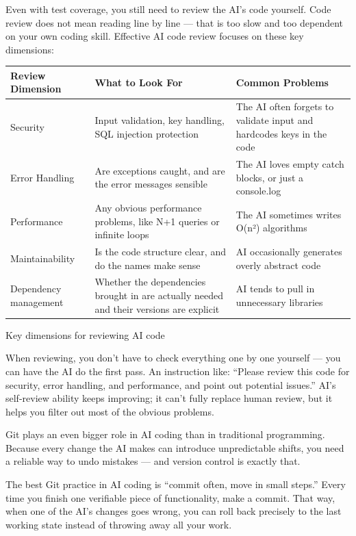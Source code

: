 
Even with test coverage, you still need to review the AI's code yourself. Code review does not mean reading line by line — that is too slow and too dependent on your own coding skill. Effective AI code review focuses on these key dimensions:

\begin{center}
\begin{tabularx}{\linewidth}{|X|X|X|}
\hline
\textbf{Review Dimension} & \textbf{What to Look For} & \textbf{Common Problems} \tabularnewline
\hline
Security & Input validation, key handling, SQL injection protection & The AI often forgets to validate input and hardcodes keys in the code \tabularnewline
Error Handling & Are exceptions caught, and are the error messages sensible & The AI loves empty catch blocks, or just a console.log \tabularnewline
Performance & Any obvious performance problems, like N+1 queries or infinite loops & The AI sometimes writes O(n²) algorithms \tabularnewline
Maintainability & Is the code structure clear, and do the names make sense & AI occasionally generates overly abstract code \tabularnewline
Dependency management & Whether the dependencies brought in are actually needed and their versions are explicit & AI tends to pull in unnecessary libraries \tabularnewline
\hline
\end{tabularx}
\end{center}

\begin{center}\small\color{gray}Key dimensions for reviewing AI code\end{center}

When reviewing, you don't have to check everything one by one yourself — you can have the AI do the first pass. An instruction like: “Please review this code for security, error handling, and performance, and point out potential issues.” AI's self-review ability keeps improving; it can't fully replace human review, but it helps you filter out most of the obvious problems.


Git plays an even bigger role in AI coding than in traditional programming. Because every change the AI makes can introduce unpredictable shifts, you need a reliable way to undo mistakes — and version control is exactly that.

The best Git practice in AI coding is “commit often, move in small steps.” Every time you finish one verifiable piece of functionality, make a commit. That way, when one of the AI's changes goes wrong, you can roll back precisely to the last working state instead of throwing away all your work.


